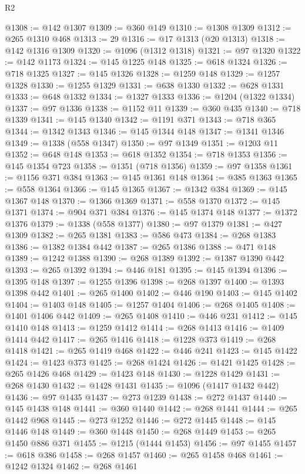 \begin{lexlean}{R2}
\begin{coremodule}
@1308 := @142 @1307
@1309 := @360 @149
@1310 := @1308 @1309
@1312 := @265 @1310 @468
@1313 := 29
@1316 := @17 @1313 (@20 @1313)
@1318 := @142 @1316 @1309
@1320 := @1096 (@1312 @1318)
@1321 := @97 @1320
@1322 := @142 @1173
@1324 := @145 @1225 @148
@1325 := @618 @1324
@1326 := @718 @1325
@1327 := @145 @1326
@1328 := @1259 @148
@1329 := @1257 @1328
@1330 := @1255 @1329
@1331 := @638 @1330
@1332 := @628 @1331
@1333 := @648 @1332
@1334 := @1327 @1333
@1336 := @1204 (@1322 @1334)
@1337 := @97 @1336
@1338 := @1152 @11
@1339 := @360 @435
@1340 := @718 @1339
@1341 := @145 @1340
@1342 := @1191 @371
@1343 := @718 @365
@1344 := @1342 @1343
@1346 := @145 @1344 @148
@1347 := @1341 @1346
@1349 := @1338 (@558 @1347)
@1350 := @97 @1349
@1351 := @1203 @11
@1352 := @648 @148
@1353 := @618 @1352
@1354 := @718 @1353
@1356 := @145 @1354 @723
@1358 := @1351 (@718 @1356)
@1359 := @97 @1358
@1361 := @1156 @371 @384
@1363 := @145 @1361 @148
@1364 := @385 @1363
@1365 := @558 @1364
@1366 := @145 @1365
@1367 := @1342 @384
@1369 := @145 @1367 @148
@1370 := @1366 @1369
@1371 := @558 @1370
@1372 := @145 @1371
@1374 := @904 @371 @384
@1376 := @145 @1374 @148
@1377 := @1372 @1376
@1379 := @1338 (@558 @1377)
@1380 := @97 @1379
@1381 := @427 @1309
@1382 := @265 @1381
@1383 := @586 @473
@1384 := @268 @1383
@1386 := @1382 @1384 @442
@1387 := @265 @1386
@1388 := @471 @148
@1389 := @1242 @1388
@1390 := @268 @1389
@1392 := @1387 @1390 @442
@1393 := @265 @1392
@1394 := @446 @181
@1395 := @145 @1394
@1396 := @1395 @148
@1397 := @1255 @1396
@1398 := @268 @1397
@1400 := @1393 @1398 @442
@1401 := @265 @1400
@1402 := @446 @190
@1403 := @145 @1402
@1404 := @1403 @148
@1405 := @1257 @1404
@1406 := @268 @1405
@1408 := @1401 @1406 @442
@1409 := @265 @1408
@1410 := @446 @231
@1412 := @145 @1410 @148
@1413 := @1259 @1412
@1414 := @268 @1413
@1416 := @1409 @1414 @442
@1417 := @265 @1416
@1418 := @1228 @373
@1419 := @268 @1418
@1421 := @265 @1419 @468
@1422 := @446 @241
@1423 := @145 @1422
@1424 := @1423 @373
@1425 := @268 @1424
@1426 := @1421 @1425
@1428 := @265 @1426 @468
@1429 := @1423 @148
@1430 := @1228 @1429
@1431 := @268 @1430
@1432 := @1428 @1431
@1435 := @1096 (@1417 @1432 @442)
@1436 := @97 @1435
@1437 := @273 @1239
@1438 := @272 @1437
@1440 := @145 @1438 @148
@1441 := @360 @1440
@1442 := @268 @1441
@1444 := @265 @1442 @968
@1445 := @273 @1252
@1446 := @272 @1445
@1448 := @145 @1446 @148
@1449 := @360 @1448
@1450 := @268 @1449
@1453 := @265 @1450 @886 @371
@1455 := @1215 (@1444 @1453)
@1456 := @97 @1455
@1457 := @618 @386
@1458 := @268 @1457
@1460 := @265 @1458 @468
@1461 := @1242 @1324
@1462 := @268 @1461

\end{coremodule}
\end{lexlean}
